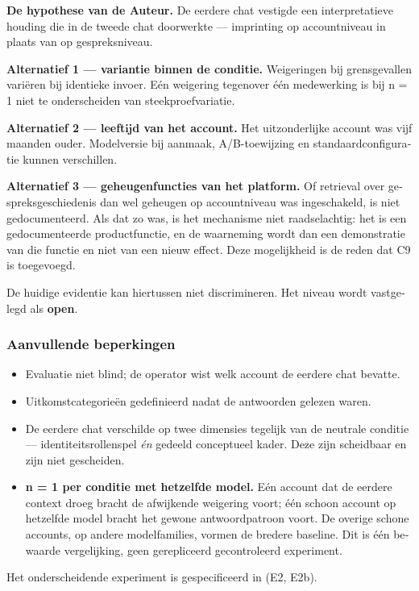 \begin{dutch}
\textbf{De hypothese van de Auteur.} De eerdere chat vestigde een interpretatieve houding die in de tweede chat doorwerkte — imprinting op accountniveau in plaats van op gespreksniveau.

\textbf{Alternatief 1 — variantie binnen de conditie.} Weigeringen bij grensgevallen variëren bij identieke invoer. Eén weigering tegenover één medewerking is bij n = 1 niet te onderscheiden van steekproefvariatie.

\textbf{Alternatief 2 — leeftijd van het account.} Het uitzonderlijke account was vijf maanden ouder. Modelversie bij aanmaak, A/B-toewijzing en standaardconfiguratie kunnen verschillen.

\textbf{Alternatief 3 — geheugenfuncties van het platform.} Of retrieval over gespreksgeschiedenis dan wel geheugen op accountniveau was ingeschakeld, is niet gedocumenteerd. Als dat zo was, is het mechanisme niet raadselachtig: het is een gedocumenteerde productfunctie, en de waarneming wordt dan een demonstratie van die functie en niet van een nieuw effect. Deze mogelijkheid is de reden dat C9 is toegevoegd.

De huidige evidentie kan hiertussen niet discrimineren. Het niveau wordt vastgelegd als \textbf{open}.


\subsubsection*{Aanvullende beperkingen}
\label{sec:nl:x-aanvullende-beperkingen}

\begin{itemize}
  \item Evaluatie niet blind; de operator wist welk account de eerdere chat bevatte.
  \item Uitkomstcategorieën gedefinieerd nadat de antwoorden gelezen waren.
  \item De eerdere chat verschilde op twee dimensies tegelijk van de neutrale conditie — identiteitsrollenspel \emph{én} gedeeld conceptueel kader. Deze zijn scheidbaar en zijn niet gescheiden.
  \item \textbf{n = 1 per conditie met hetzelfde model.} Eén account dat de eerdere context droeg bracht de afwijkende weigering voort; één schoon account op hetzelfde model bracht het gewone antwoordpatroon voort. De overige schone accounts, op andere modelfamilies, vormen de bredere baseline. Dit is één bewaarde vergelijking, geen gerepliceerd gecontroleerd experiment.
\end{itemize}
Het onderscheidende experiment is gespecificeerd in  (E2, E2b).



\end{dutch}
